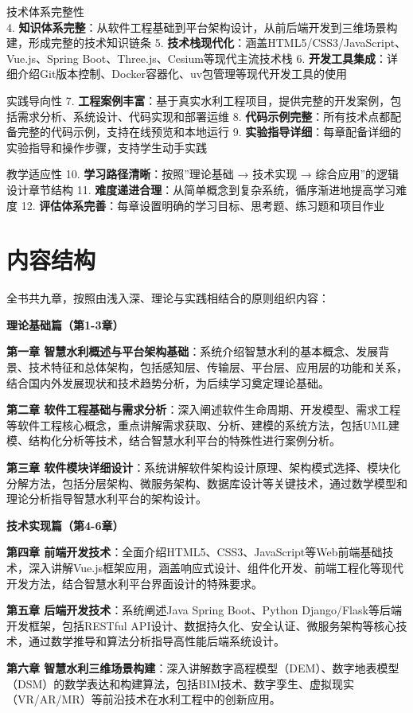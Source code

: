  技术体系完整性\\
4. \textbf{知识体系完整}：从软件工程基础到平台架构设计，从前后端开发到三维场景构建，形成完整的技术知识链条 5. \textbf{技术栈现代化}：涵盖HTML5/CSS3/JavaScript、Vue.js、Spring Boot、Three.js、Cesium等现代主流技术栈 6. \textbf{开发工具集成}：详细介绍Git版本控制、Docker容器化、uv包管理等现代开发工具的使用

 实践导向性 7. \textbf{工程案例丰富}：基于真实水利工程项目，提供完整的开发案例，包括需求分析、系统设计、代码实现和部署运维 8. \textbf{代码示例完整}：所有技术点都配备完整的代码示例，支持在线预览和本地运行 9. \textbf{实验指导详细}：每章配备详细的实验指导和操作步骤，支持学生动手实践

 教学适应性 10. \textbf{学习路径清晰}：按照''理论基础 → 技术实现 → 综合应用''的逻辑设计章节结构 11. \textbf{难度递进合理}：从简单概念到复杂系统，循序渐进地提高学习难度 12. \textbf{评估体系完善}：每章设置明确的学习目标、思考题、练习题和项目作业

\section{内容结构}

全书共九章，按照由浅入深、理论与实践相结合的原则组织内容：

\begin{tcolorbox}[colback=blue!5!white,colframe=blue!75!black,title=章节概览]
\textbf{理论基础篇（第1-3章）}

\textbf{第一章 智慧水利概述与平台架构基础}：系统介绍智慧水利的基本概念、发展背景、技术特征和总体架构，包括感知层、传输层、平台层、应用层的功能和关系，结合国内外发展现状和技术趋势分析，为后续学习奠定理论基础。

\textbf{第二章 软件工程基础与需求分析}：深入阐述软件生命周期、开发模型、需求工程等软件工程核心概念，重点讲解需求获取、分析、建模的系统方法，包括UML建模、结构化分析等技术，结合智慧水利平台的特殊性进行案例分析。

\textbf{第三章 软件模块详细设计}：系统讲解软件架构设计原理、架构模式选择、模块化分解方法，包括分层架构、微服务架构、数据库设计等关键技术，通过数学模型和理论分析指导智慧水利平台的架构设计。

\textbf{技术实现篇（第4-6章）}

\textbf{第四章 前端开发技术}：全面介绍HTML5、CSS3、JavaScript等Web前端基础技术，深入讲解Vue.js框架应用，涵盖响应式设计、组件化开发、前端工程化等现代开发方法，结合智慧水利平台界面设计的特殊要求。

\textbf{第五章 后端开发技术}：系统阐述Java Spring Boot、Python Django/Flask等后端开发框架，包括RESTful API设计、数据持久化、安全认证、微服务架构等核心技术，通过数学推导和算法分析指导高性能后端系统设计。

\textbf{第六章 智慧水利三维场景构建}：深入讲解数字高程模型（DEM）、数字地表模型（DSM）的数学表达和构建算法，包括BIM技术、数字孪生、虚拟现实（VR/AR/MR）等前沿技术在水利工程中的创新应用。
\end{tcolorbox}

